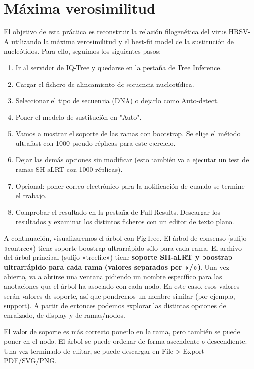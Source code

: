 \section{Máxima verosimilitud}
El objetivo de esta práctica es reconstruir la relación filogenética del virus HRSV-A utilizando la máxima verosimilitud y el best-fit model de la sustitución de nucleótidos. Para ello, seguimos los siguientes pasos:
\begin{enumerate}
\item Ir al \href{http://iqtree.cibiv.univie.ac.at/}{servidor de IQ-Tree} y quedarse en la pestaña de Tree Inference.
\item Cargar el fichero de alineamiento de secuencia nucleotídica.
\item Seleccionar el tipo de secuencia (DNA) o dejarlo como Auto-detect.
\item Poner el modelo de sustitución en "Auto".
\item Vamos a mostrar el soporte de las ramas con bootstrap. Se elige el método ultrafast con 1000 pseudo-réplicas para este ejercicio.
\item Dejar las demás opciones sin modificar (esto también va a ejecutar un test de ramas SH-aLRT con 1000 réplicas).
\item Opcional: poner correo electrónico para la notificación de cuando se termine el trabajo.
\item Comprobar el resultado en la pestaña de Full Results. Descargar los resultados y examinar los distintos ficheros con un editor de texto plano.  
\end{enumerate}
A continuación, visualizaremos el árbol con FigTree. El árbol de consenso (sufijo «contree») tiene soporte boostrap ultrarrápido sólo para cada rama. El archivo del árbol principal (sufijo «treefile») tiene \textbf{soporte SH-aLRT y boostrap ultrarrápido para cada rama (valores separados por «/»)}. Una vez abierto, va a abrirse una ventana pidiendo un nombre específico para las anotaciones que el árbol ha asociado con cada nodo. En este caso, esos valores serán valores de soporte, así que pondremos un nombre similar (por ejemplo, support). A partir de entonces podemos explorar las distintas opciones de enraizado, de display y de ramas/nodos. 

El valor de soporte es más correcto ponerlo en la rama, pero también se puede poner en el nodo. El árbol se puede ordenar de forma ascendente o descendiente. Una vez terminado de editar, se puede descargar en File > Export PDF/SVG/PNG.